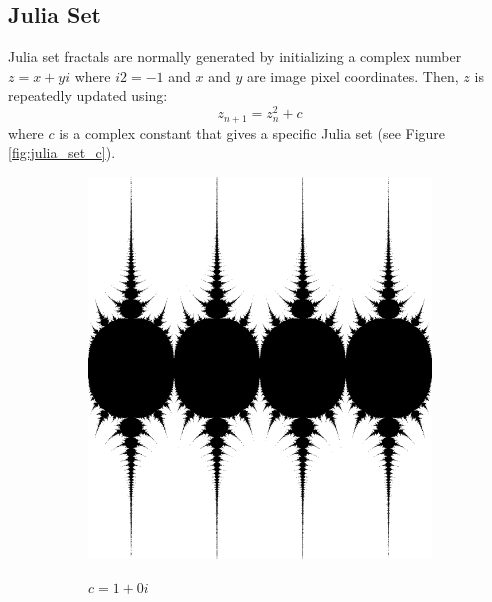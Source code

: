 \subsection{Julia Set}
\label{sec:julia_math}
Julia set fractals are normally generated by initializing a complex number  $z = x + yi$  where  $i2 = -1$  and $x$ and $y$ are image pixel coordinates. Then, $z$ is repeatedly updated using:
\[ 
 z_{n+1} = z_n^2 + c
\]  
where $c$ is a complex constant that gives a specific Julia set (see Figure \ref{fig:julia_set_c}).

\begin{figure}[!htb]

    \begin{subfigure}{1.0\textwidth}
        \includegraphics[width=\linewidth]{./images/opencal/julia1.png}
        \label{fig:julia1}
        \caption{$c=1+0i$}
    \end{subfigure}        
    \endminipage\hfill
    \begin{subfigure}{1.0\textwidth}

\end{subfigure}
\end{figure}
